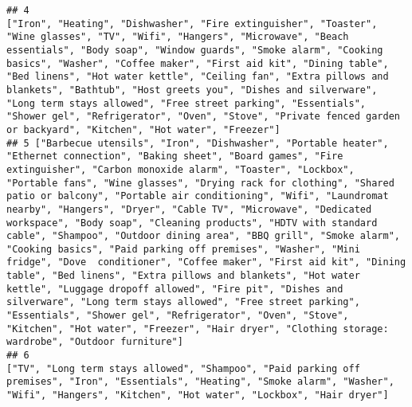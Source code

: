 \documentclass[
]{article}
\begin{document}
\begin{verbatim}
## 4                                                                                                                                                                                                                                                                                                                                                                                                                                          ["Iron", "Heating", "Dishwasher", "Fire extinguisher", "Toaster", "Wine glasses", "TV", "Wifi", "Hangers", "Microwave", "Beach essentials", "Body soap", "Window guards", "Smoke alarm", "Cooking basics", "Washer", "Coffee maker", "First aid kit", "Dining table", "Bed linens", "Hot water kettle", "Ceiling fan", "Extra pillows and blankets", "Bathtub", "Host greets you", "Dishes and silverware", "Long term stays allowed", "Free street parking", "Essentials", "Shower gel", "Refrigerator", "Oven", "Stove", "Private fenced garden or backyard", "Kitchen", "Hot water", "Freezer"]
## 5 ["Barbecue utensils", "Iron", "Dishwasher", "Portable heater", "Ethernet connection", "Baking sheet", "Board games", "Fire extinguisher", "Carbon monoxide alarm", "Toaster", "Lockbox", "Portable fans", "Wine glasses", "Drying rack for clothing", "Shared patio or balcony", "Portable air conditioning", "Wifi", "Laundromat nearby", "Hangers", "Dryer", "Cable TV", "Microwave", "Dedicated workspace", "Body soap", "Cleaning products", "HDTV with standard cable", "Shampoo", "Outdoor dining area", "BBQ grill", "Smoke alarm", "Cooking basics", "Paid parking off premises", "Washer", "Mini fridge", "Dove  conditioner", "Coffee maker", "First aid kit", "Dining table", "Bed linens", "Extra pillows and blankets", "Hot water kettle", "Luggage dropoff allowed", "Fire pit", "Dishes and silverware", "Long term stays allowed", "Free street parking", "Essentials", "Shower gel", "Refrigerator", "Oven", "Stove", "Kitchen", "Hot water", "Freezer", "Hair dryer", "Clothing storage: wardrobe", "Outdoor furniture"]
## 6                                                                                                                                                                                                                                                                                                                                                                                                                                                                                                                                                                                                                                                                                                                                                                                                                                     ["TV", "Long term stays allowed", "Shampoo", "Paid parking off premises", "Iron", "Essentials", "Heating", "Smoke alarm", "Washer", "Wifi", "Hangers", "Kitchen", "Hot water", "Lockbox", "Hair dryer"]

\end{verbatim}
\end{document}
